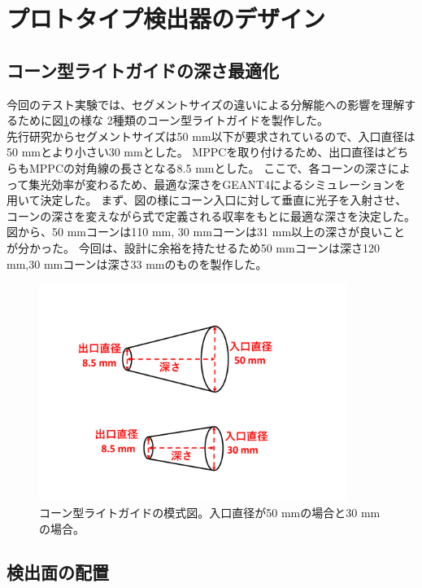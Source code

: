 \section{プロトタイプ検出器のデザイン}
\subsection{}
\subsection{コーン型ライトガイドの深さ最適化}
今回のテスト実験では、セグメントサイズの違いによる分解能への影響を理解するために図\ref{fig:cone}の様な
2種類のコーン型ライトガイドを製作した。\\
先行研究からセグメントサイズは50 mm以下が要求されているので、入口直径は50 mmとより小さい30 mmとした。
MPPCを取り付けるため、出口直径はどちらもMPPCの対角線の長さとなる8.5 mmとした。
ここで、各コーンの深さによって集光効率が変わるため、最適な深さをGEANT4によるシミュレーションを用いて決定した。
まず、図の様にコーン入口に対して垂直に光子を入射させ、コーンの深さを変えながら式で定義される収率をもとに最適な深さを決定した。
図から、50 mmコーンは110 mm, 30 mmコーンは31 mm以上の深さが良いことが分かった。
今回は、設計に余裕を持たせるため50 mmコーンは深さ120 mm,30 mmコーンは深さ33 mmのものを製作した。
\begin{figure}[htbp]
  \centering
  \includegraphics[width=10cm]{images/chapter3/cone.pdf}
  \caption{コーン型ライトガイドの模式図。入口直径が50 mmの場合と30 mmの場合。}
  \label{fig:cone}
\end{figure}

\subsection{検出面の配置}